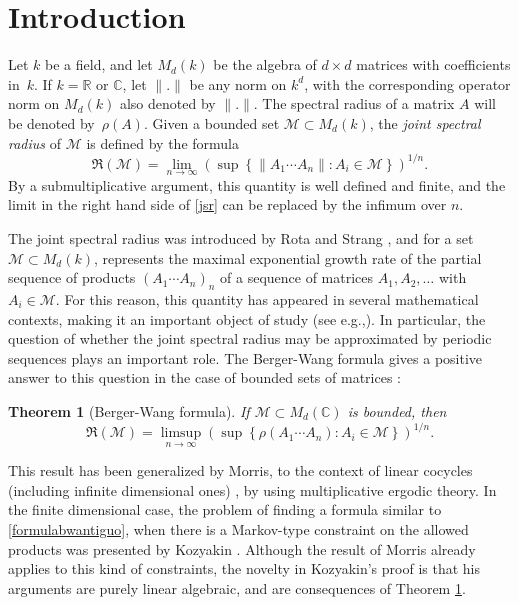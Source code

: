 \documentclass[11pt]{article}
\newcommand{\eg}{e.g.,\xspace}
\let\mathcal\mathscr
\theoremstyle{plain}
\newtheorem{teo}{Theorem}[section]
\theoremstyle{definition}
\newcommand{\CC}{\mathbb{C}}
\newcommand{\RR}{\mathbb{R}}
\newcommand{\corchete}[1]{\left\{{#1}\right\}}
\begin{document}
\section{Introduction}
Let $k$ be a field, and let $M_{d}(k)$ be the algebra of $d\times d$ matrices with coefficients in~$k$. If $k=\RR$ or $\CC$, let $\|.\|$ be any norm on $k^d$, with the corresponding operator norm on $M_{d}(k)$ also denoted by $\|.\|$. The spectral radius of a matrix $A$ will be denoted by~$\rho(A)$. Given a bounded set $\mathcal{M}\subset M_{d}(k)$, the \textit{joint spectral radius} of $\mathcal{M}$ is defined by the formula
\begin{equation}\label{jsr}
\mathfrak{R}(\mathcal{M})=\lim_{n\to \infty}{\left(\sup \corchete{\|A_{1}\cdots A_{n}\| : A_{i}\in \mathcal{M} }\right)^{1/n}}.
\end{equation}
By a submultiplicative argument, this quantity is well defined and finite, and the limit in the right hand side of \eqref{jsr} can be replaced by the infimum over $n$.

The joint spectral radius was introduced by Rota and Strang \cite{rota}, and for a set $\mathcal{M}\subset M_{d}(k)$, represents the maximal exponential growth rate of the partial sequence of products $(A_1\cdots A_n)_{n}$ of a sequence of matrices $A_1,A_2,\dots$ with $A_i\in \mathcal{M}$. For this reason, this quantity has appeared in several mathematical contexts, making it an important object of study (see \eg \cite{gur,jun,mathermorris,tsblo}). In particular, the question of whether the joint spectral radius may be approximated by periodic sequences plays an important role. The Berger-Wang formula gives a positive answer to this question in the case of bounded sets of matrices \cite{bw}:

\begin{teo}[Berger-Wang formula]\label{bergerwangantiguo}
If $\mathcal{M}\subset M_{d}(\CC)$ is bounded, then
\begin{equation}\label{formulabwantiguo}
\mathfrak{R}(\mathcal{M})=\limsup_{n\to \infty}{\left(\sup\corchete{\rho(A_{1}\cdots A_{n}) : A_{i}\in \mathcal{M}}\right)^{1/n}}.
\end{equation}
\end{teo}
This result has been generalized by Morris, to the context of linear cocycles (including infinite dimensional ones) \cite{morrisbw}, by using multiplicative ergodic theory. In the finite dimensional case, the problem of finding a formula similar to \eqref{formulabwantiguo}, when there is a Markov-type constraint on the allowed products was presented by Kozyakin \cite{kozyakin}. Although the result of Morris already applies to this kind of constraints, the novelty in Kozyakin's proof is that his arguments are purely linear algebraic, and are consequences of Theorem \ref{bergerwangantiguo}.
\end{document}
